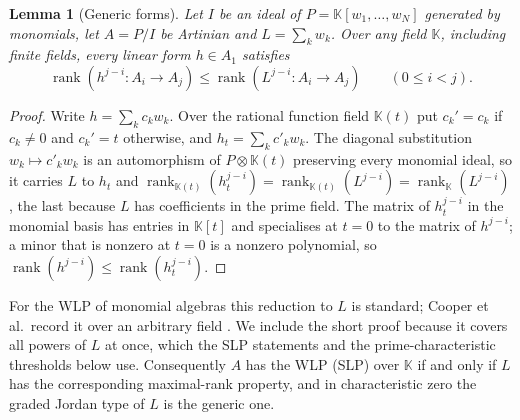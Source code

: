 \documentclass[11pt,a4paper]{article}
\newtheorem{lemma}[theorem]{Lemma}
\theoremstyle{definition}
\newcommand{\kk}{\mathbb K}
\newcommand{\rk}{\operatorname{rank}}
\begin{document}
\begin{lemma}[Generic forms]\label{generic}
Let $I$ be an ideal of $P=\kk[w_1,\dots,w_N]$ generated by monomials, let $A=P/I$ be Artinian and $L=\sum_kw_k$. Over any field $\kk$, including finite fields, every linear form $h\in A_1$ satisfies
\[
 \rk(h^{j-i}:A_i\to A_j)\le\rk(L^{j-i}:A_i\to A_j)\qquad(0\le i<j).
\]
\end{lemma}
\begin{proof}
Write $h=\sum_kc_kw_k$. Over the rational function field $\kk(t)$ put $c_k'=c_k$ if $c_k\ne0$ and $c_k'=t$ otherwise, and $h_t=\sum_kc'_kw_k$. The diagonal substitution $w_k\mapsto c'_kw_k$ is an automorphism of $P\otimes\kk(t)$ preserving every monomial ideal, so it carries $L$ to $h_t$ and $\rk_{\kk(t)}(h_t^{j-i})=\rk_{\kk(t)}(L^{j-i})=\rk_\kk(L^{j-i})$, the last because $L$ has coefficients in the prime field. The matrix of $h_t^{j-i}$ in the monomial basis has entries in $\kk[t]$ and specialises at $t=0$ to the matrix of $h^{j-i}$; a minor that is nonzero at $t=0$ is a nonzero polynomial, so $\rk(h^{j-i})\le\rk(h_t^{j-i})$.
\end{proof}

For the WLP of monomial algebras this reduction to $L$ is standard; Cooper et al.\ record it over an arbitrary field \cite[Lemma~2.2 and the remark after it]{Cooper}. We include the short proof because it covers all powers of $L$ at once, which the SLP statements and the prime-characteristic thresholds below use. Consequently $A$ has the WLP (SLP) over $\kk$ if and only if $L$ has the corresponding maximal-rank property, and in characteristic zero the graded Jordan type of $L$ is the generic one.
\end{document}
